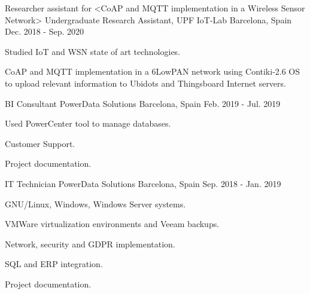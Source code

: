 


\begin{cventries}


\cventry
{Researcher assistant for <CoAP and MQTT implementation in a Wireless Sensor Network>} %
{Undergraduate Research Assistant, UPF IoT-Lab} %
{Barcelona, Spain} %
{Dec. 2018 - Sep. 2020} %
{ %
\begin{cvitems}
\item {Studied IoT and WSN state of art technologies.}
\item {CoAP and MQTT implementation in a 6LowPAN network using Contiki-2.6 OS to upload relevant information to Ubidots and Thingsboard Internet servers.}
\end{cvitems} 
}


\cventry
{BI Consultant} %
{PowerData Solutions} %
{Barcelona, Spain} %
{Feb. 2019 - Jul. 2019} %
{ %
\begin{cvitems}
\item {Used PowerCenter tool to manage databases.}
\item {Customer Support.}
\item {Project documentation.}
\end{cvitems}
}


\cventry
{IT Technician} %
{PowerData Solutions} %
{Barcelona, Spain} %
{Sep. 2018 - Jan. 2019} %
{ %
\begin{cvitems}
\item {GNU/Linux, Windows, Windows Server systems.}
\item {VMWare virtualization environments and Veeam backups.}
\item {Network, security and GDPR implementation.}
\item {SQL and ERP integration.}
\item {Project documentation.}
\end{cvitems}
}


\end{cventries}
